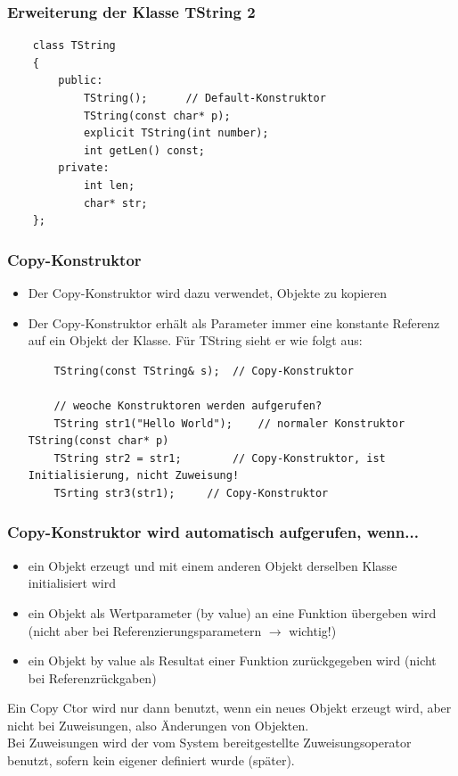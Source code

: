 \subsubsection{Erweiterung der Klasse TString 2}
\label{sec:Erweiterung der Klasse TString 2}
\noindent
\begin{minipage}{\linewidth}
	\begin{lstlisting}
	class TString
	{
		public:
			TString();		// Default-Konstruktor
			TString(const char* p);
			explicit TString(int number);
			int getLen() const;
		private:
			int len;
			char* str;
	};
	\end{lstlisting}
\end{minipage}

\subsubsection{Copy-Konstruktor}
\label{sec:Copy-Konstruktor}
\begin{itemize}
	\item Der Copy-Konstruktor wird dazu verwendet, Objekte zu kopieren
	\item Der Copy-Konstruktor erhält als Parameter immer eine konstante Referenz auf ein Objekt der Klasse. Für TString sieht er wie folgt aus:
	\begin{lstlisting}
	TString(const TString& s);	// Copy-Konstruktor
	
	// weoche Konstruktoren werden aufgerufen?
	TString str1("Hello World");	// normaler Konstruktor TString(const char* p)
	TString str2 = str1;		// Copy-Konstruktor, ist Initialisierung, nicht Zuweisung!
	TSrting str3(str1);		// Copy-Konstruktor
	\end{lstlisting}
\end{itemize}

\subsubsection{Copy-Konstruktor wird automatisch aufgerufen, wenn...}
\label{sec:Copy-Konstruktor wird automatisch aufgerufen, wenn...}
\begin{itemize}
	\item ein Objekt erzeugt und mit einem anderen Objekt derselben Klasse initialisiert wird
	\item ein Objekt als Wertparameter (by value) an eine Funktion übergeben wird (nicht aber bei Referenzierungsparametern $\rightarrow$ \color{red}wichtig!\color{black})
	\item ein Objekt by value als Resultat einer Funktion zurückgegeben wird (nicht bei Referenzrückgaben)
\end{itemize}
Ein Copy Ctor wird nur dann benutzt, wenn ein neues Objekt erzeugt wird, aber nicht bei Zuweisungen, also Änderungen von Objekten.\\
Bei Zuweisungen wird der vom System bereitgestellte Zuweisungsoperator benutzt, sofern kein eigener definiert wurde (später).

